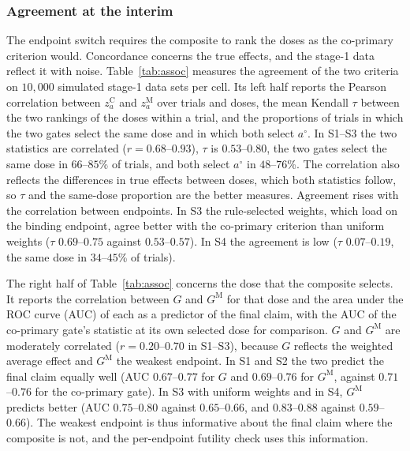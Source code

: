 \begin{table}
\centering\footnotesize
\caption{Agreement between the composite and the co-primary criterion on stage-1 data at $n_1=100$.}\label{tab:assoc}

\end{table}

\subsubsection{Agreement at the interim}
The endpoint switch requires the composite to rank the doses as the co-primary criterion would. Concordance concerns the true effects, and the stage-1 data reflect it with noise. Table~\ref{tab:assoc} measures the agreement of the two criteria on $10{,}000$ simulated stage-1 data sets per cell. Its left half reports the Pearson correlation between $z^{\mathrm{C}}_a$ and $z^{\mathrm{M}}_a$ over trials and doses, the mean Kendall $\tau$ between the two rankings of the doses within a trial, and the proportions of trials in which the two gates select the same dose and in which both select $a^\circ$. In S1--S3 the two statistics are correlated ($r=0.68$--$0.93$), $\tau$ is $0.53$--$0.80$, the two gates select the same dose in $66$--$85$\% of trials, and both select $a^\circ$ in $48$--$76$\%. The correlation also reflects the differences in true effects between doses, which both statistics follow, so $\tau$ and the same-dose proportion are the better measures. Agreement rises with the correlation between endpoints. In S3 the rule-selected weights, which load on the binding endpoint, agree better with the co-primary criterion than uniform weights ($\tau$ $0.69$--$0.75$ against $0.53$--$0.57$). In S4 the agreement is low ($\tau$ $0.07$--$0.19$, the same dose in $34$--$45$\% of trials).

The right half of Table~\ref{tab:assoc} concerns the dose that the composite selects. It reports the correlation between $G$ and $G^{\mathrm{M}}$ for that dose and the area under the ROC curve (AUC) of each as a predictor of the final claim, with the AUC of the co-primary gate's statistic at its own selected dose for comparison. $G$ and $G^{\mathrm{M}}$ are moderately correlated ($r=0.20$--$0.70$ in S1--S3), because $G$ reflects the weighted average effect and $G^{\mathrm{M}}$ the weakest endpoint. In S1 and S2 the two predict the final claim equally well (AUC $0.67$--$0.77$ for $G$ and $0.69$--$0.76$ for $G^{\mathrm{M}}$, against $0.71$--$0.76$ for the co-primary gate). In S3 with uniform weights and in S4, $G^{\mathrm{M}}$ predicts better (AUC $0.75$--$0.80$ against $0.65$--$0.66$, and $0.83$--$0.88$ against $0.59$--$0.66$). The weakest endpoint is thus informative about the final claim where the composite is not, and the per-endpoint futility check uses this information.

